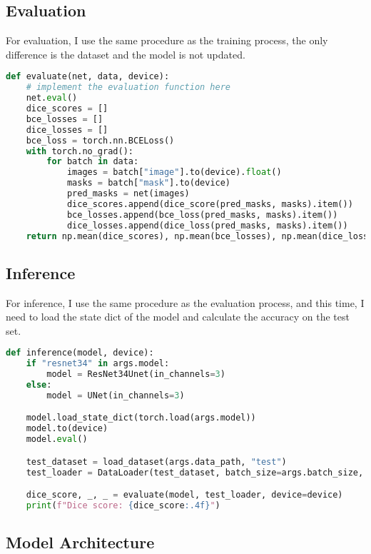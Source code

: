 \subsection{Evaluation}
For evaluation, I use the same procedure as the training process, the only difference is the dataset and the model is not updated.

\begin{lstlisting}[language=Python, caption=evaluate.py: Evaluate, label=lst:evaluate]
def evaluate(net, data, device):
    # implement the evaluation function here
    net.eval()
    dice_scores = []
    bce_losses = []
    dice_losses = []
    bce_loss = torch.nn.BCELoss()
    with torch.no_grad():
        for batch in data:
            images = batch["image"].to(device).float()
            masks = batch["mask"].to(device)
            pred_masks = net(images)
            dice_scores.append(dice_score(pred_masks, masks).item())
            bce_losses.append(bce_loss(pred_masks, masks).item())
            dice_losses.append(dice_loss(pred_masks, masks).item())
    return np.mean(dice_scores), np.mean(bce_losses), np.mean(dice_losses)
\end{lstlisting}

\subsection{Inference}
For inference, I use the same procedure as the evaluation process, and this time, I need to load the state dict of the model and calculate the accuracy on the test set.

\begin{lstlisting}[language=Python, caption=inference.py: Inference, label=lst:inference]
def inference(model, device):
    if "resnet34" in args.model:
        model = ResNet34Unet(in_channels=3)
    else:
        model = UNet(in_channels=3)

    model.load_state_dict(torch.load(args.model))
    model.to(device)
    model.eval()

    test_dataset = load_dataset(args.data_path, "test")
    test_loader = DataLoader(test_dataset, batch_size=args.batch_size, shuffle=False)

    dice_score, _, _ = evaluate(model, test_loader, device=device)
    print(f"Dice score: {dice_score:.4f}")
\end{lstlisting}


\subsection{Model Architecture}

